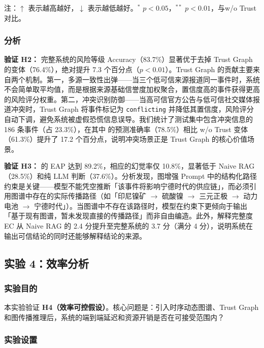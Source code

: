 注：$\uparrow$ 表示越高越好，$\downarrow$ 表示越低越好。$^{*}$ $p < 0.05$，$^{**}$ $p < 0.01$，与\projectshort w/o Trust 对比。

\subsubsection{分析}

\textbf{验证 H2：} \projectshort 完整系统的风险等级 Accuracy（83.7\%）显著优于去掉 Trust Graph 的变体（76.4\%），绝对提升 7.3 个百分点（$p < 0.01$）。Trust Graph 的贡献主要来自两个机制。第一，多源一致性出弹——当三个低可信来源报道同一事件时，系统不会简单取平均值，而是根据来源基础信誉度加权聚合，置信度高的事件获得更高的风险评分权重。第二，冲突识别防御——当高可信官方公告与低可信社交媒体报道冲突时，Trust Graph 将事件标记为 \texttt{conflicting} 并降低其置信度，风险评分自动下调，避免系统被虚假恐慌信息误导。我们统计了测试集中包含冲突信息的 186 条事件（占 23.3\%），在其中 \projectshort 的预测准确率（78.5\%）相比 w/o Trust 变体（61.3\%）提升了 17.2 个百分点，说明冲突场景正是 Trust Graph 的核心价值场景。

\textbf{验证 H3：} \projectshort 的 EAP 达到 89.2\%，相应的幻觉率仅 10.8\%，显著低于 Naive RAG（28.5\%）和纯 LLM 判断（37.6\%）。分析发现，图增强 Prompt 中的结构化路径约束是关键——模型不能凭空推断「该事件将影响宁德时代的供应链」，而必须引用图谱中存在的实际传播路径（如「印尼镍矿 $\to$ 硫酸镍 $\to$ 三元正极 $\to$ 动力电池 $\to$ 宁德时代」）。当图谱中不存在该路径时，模型在约束下更倾向于输出「基于现有图谱，暂未发现直接的传播路径」而非自由编造。此外，解释完整度 EC 从 Naive RAG 的 2.4 分提升至完整系统的 3.7 分（满分 4 分），说明系统在输出可信结论的同时还能够解释结论的来源。

\subsection{实验 4：效率分析}
\label{sec:exp-efficiency}

\subsubsection{实验目的}

本实验验证 \textbf{H4（效率可控假设）}。核心问题是：引入时序动态图谱、Trust Graph 和图传播推理后，系统的端到端延迟和资源开销是否在可接受范围内？

\subsubsection{实验设置}

